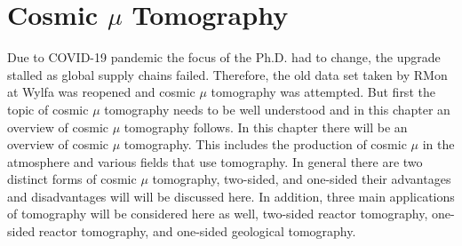 
\chapter{Cosmic $\mu$ Tomography}\label{chp:cosmicMuTelescopes}

\ifpdf
    \graphicspath{{Chapter5/Figs/Raster/}{Chapter5/Figs/PDF/}{Chapter5/Figs/}}
\else
    \graphicspath{{Chapter5/Figs/Vector/}{Chapter5/Figs/}}
\fi



Due to COVID-19 pandemic the focus of the Ph.D. had to change, the upgrade stalled as global supply chains failed. Therefore, the old data set taken by RMon at Wylfa was reopened and cosmic $\mu$ tomography was attempted. But first the topic of cosmic $\mu$ tomography needs to be well understood and in this chapter an overview of cosmic $\mu$ tomography follows. In this chapter there will be an overview of cosmic $\mu$ tomography. This includes the production of cosmic $\mu$ in the atmosphere and various fields that use tomography. In general there are two distinct forms of cosmic $\mu$ tomography, two-sided, and one-sided their advantages and disadvantages will will be discussed here. In addition, three main applications of tomography will be considered here as well, two-sided reactor tomography, one-sided reactor tomography, and one-sided geological tomography.

